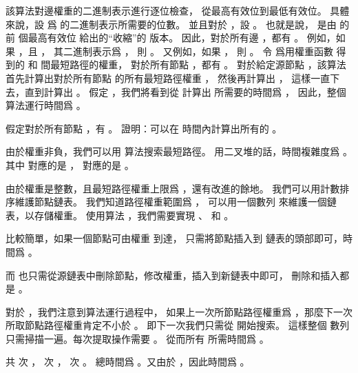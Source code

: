 該算法對邊權重的二進制表示進行逐位檢查，
從最高有效位到最低有效位。
具體來說，設  爲  的二進制表示所需要的位數。
並且對於 ，設 。
也就是說，  是由  的前  個最高有效位
給出的“收縮”的  版本。
因此，對於所有邊 ，都有 。
例如，如果 ，且 ，
其二進制表示爲 \m{\langle 11001\rangle}，
則 。
又例如，如果 ，
則 。
令  爲用權重函數  得到的  和  間最短路徑的權重，
對於所有節點 ，都有 。
對於給定源節點 ，該算法首先計算出對於所有節點  的所有最短路徑權重 ，
然後再計算出 ，
這樣一直下去，直到計算出 。
假定 ，我們將看到從  計算出  所需要的時間爲 ，
因此，整個算法運行時間爲 。

\startigBase[a]\startitem
假定對於所有節點 ，有 。
證明：可以在  時間內計算出所有的 。
\stopitem\stopigBase

\startANSWER
由於權重非負，我們可以用  算法搜索最短路徑。
用二叉堆的話，時間複雜度爲 。
其中  對應的是 ，
  對應的是 。

由於權重是整數，且最短路徑權重上限爲 ，還有改進的餘地。
我們可以用計數排序維護節點鏈表。
我們知道路徑權重範圍爲 \m{[0,|E|]}，
可以用一個數列  來維護一個鏈表，以存儲權重。
使用算法 ，我們需要實現 、  和 。

 比較簡單，如果一個節點可由權重  到達，
只需將節點插入到  鏈表的頭部即可，時間爲 。

而  也只需從源鏈表中刪除節點，修改權重，插入到新鏈表中即可，
刪除和插入都是 。

對於 ，我們注意到算法運行過程中，
如果上一次所節點路徑權重爲 ，那麼下一次所取節點路徑權重肯定不小於 。
即下一次我們只需從  開始搜索。
這樣整個  數列只需掃描一遍。每次提取操作需要 。
從而所有  所需時間爲 。

共  次 ，  次 ，  次 。
總時間爲 。又由於 ，因此時間爲 。
\stopANSWER

